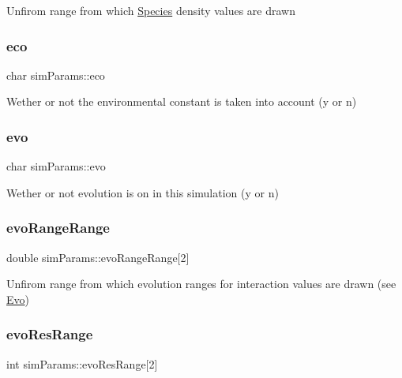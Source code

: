 Unfirom range from which \hyperlink{classSpecies}{Species} density values are drawn \mbox{\label{structsimParams_ac1a96378c33a770e34ffba03498735c9}} 
\subsubsection{\texorpdfstring{eco}{eco}}
{\footnotesize\ttfamily char sim\+Params\+::eco}

Wether or not the environmental constant is taken into account (\textquotesingle{}y\textquotesingle{} or \textquotesingle{}n\textquotesingle{}) \mbox{\label{structsimParams_a26cb871bb244145cf0b4d1754864f276}} 
\subsubsection{\texorpdfstring{evo}{evo}}
{\footnotesize\ttfamily char sim\+Params\+::evo}

Wether or not evolution is on in this simulation (\textquotesingle{}y\textquotesingle{} or \textquotesingle{}n\textquotesingle{}) \mbox{\label{structsimParams_a328c95295bd7872174fa9a22c9c402cd}} 
\subsubsection{\texorpdfstring{evo\+Range\+Range}{evoRangeRange}}
{\footnotesize\ttfamily double sim\+Params\+::evo\+Range\+Range\mbox{[}2\mbox{]}}

Unfirom range from which evolution ranges for interaction values are drawn (see \hyperlink{classEvo}{Evo}) \mbox{\label{structsimParams_a4121b97ac4b40f6d309693847309ce6b}} 
\subsubsection{\texorpdfstring{evo\+Res\+Range}{evoResRange}}
{\footnotesize\ttfamily int sim\+Params\+::evo\+Res\+Range\mbox{[}2\mbox{]}}

